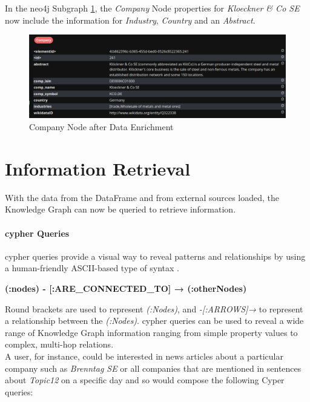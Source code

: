 In the neo4j Subgraph \ref{fig:kg-data-4-company}, the \emph{Company} Node properties for \emph{Kloeckner \& Co SE} now include the information
for \emph{Industry}, \emph{Country} and an \emph{Abstract}.

\begin{figure}[H]
	\centering
	\includegraphics[width=\textwidth]{Assets/kg-data-4-company}
	\caption{Company Node after Data Enrichment}
	\label{fig:kg-data-4-company}
\end{figure}


\section{Information Retrieval}
With the data from the DataFrame and from external sources loaded, the Knowledge Graph can now be queried to retrieve information.

\paragraph{\gls{cypher} Queries}
\gls{cypher} queries provide a visual way to reveal patterns and relationships by using a human-friendly ASCII-based type of syntax \cite{neo4j}.

\begin{center}
    \textbf{(:nodes) - [:ARE\_CONNECTED\_TO] → (:otherNodes)}
\end{center}

Round brackets are used to represent \emph{(:Nodes)}, and \emph{-[:ARROWS]→} to represent a relationship between the \emph{(:Nodes)}.
\gls{cypher} queries can be used to reveal a wide range of Knowledge Graph information ranging from simple property values to complex, multi-hop relations.\\
A user, for instance, could be interested in news articles about a particular company such as \emph{Brenntag SE} or all companies that are mentioned in sentences about \emph{Topic12} on a specific day and so would compose the following Cyper queries:

